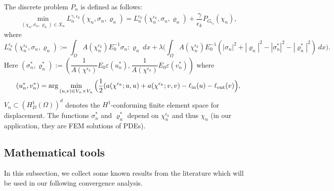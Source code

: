 \documentclass{amsart}
\begin{document}
The discrete problem $P_n$ is defined as follows: 
\begin{align}
    \min_{(\chi_n,\sigma_n,\varrho_n)\in X_n}L_n^{\gamma,\epsilon_k}(\chi_n,\sigma_n,\varrho_n)=L_n^{\epsilon_k}(\chi_n^{\epsilon_k},\sigma_n,\varrho_n)+\dfrac{\gamma}{\epsilon_k} P_{G_{\epsilon_k}}(\chi_n),
\end{align}
where
$$L_n^{\epsilon_k}(\chi_n^{\epsilon_k},\sigma_n,\varrho_n):=\int_\Omega A(\chi_n^{\epsilon_k})E_0^{-1}\sigma_n:\varrho_n\ dx + \lambda\Big(\int_\Omega A(\chi_n^{\epsilon_k})E_0^{-1}(|\sigma_n|^2+|\varrho_n|^2-|\sigma_n^*|^2-|\varrho_n^*|^2)\ dx\Big).$$
Here $(\sigma^*_n,\varrho^*_n):=(\dfrac{1}{A(\chi^{\epsilon_k})}E_0\varepsilon(u^*_n),\dfrac{1}{A(\chi^{\epsilon_k})}E_0\varepsilon(v^*_n))$ where
$$(u^*_n,v^*_n)=\arg\min_{(u,v)\in V_n\times V_n}\Big(\dfrac{1}{2}(a(\chi^{\epsilon_k};u,u)+a(\chi^{\epsilon_k};v,v)-\ell_{\rm in}(u)-\ell_{\rm out}(v)\Big),$$
$V_n\subset (H_D^1(\Omega))^d$ denotes the $H^1$-conforming finite element space for  displacement. The functions \( \sigma_n^* \) and \( \varrho_n^* \) depend on $\chi_n^{\epsilon_k}$ and thus \( \chi_n \) (in our application, they are FEM solutions of PDEs).


\subsection{Mathematical tools}In this subsection, we collect some known results from the literature which will be used in our following convergence analysis.
\end{document}
